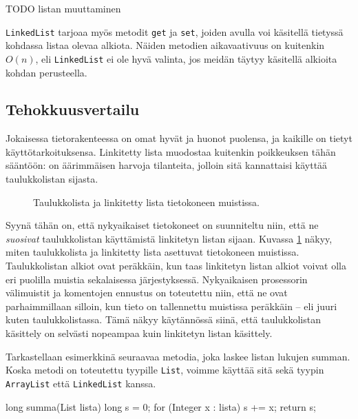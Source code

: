 TODO listan muuttaminen

\texttt{LinkedList} tarjoaa myös metodit \texttt{get} ja \texttt{set},
joiden avulla voi käsitellä tietyssä kohdassa listaa olevaa alkiota.
Näiden metodien aikavaativuus on kuitenkin $O(n)$,
eli \texttt{LinkedList} ei ole hyvä valinta,
jos meidän täytyy käsitellä alkioita kohdan perusteella.

\subsection{Tehokkuusvertailu}

Jokaisessa tietorakenteessa on omat hyvät ja huonot puolensa,
ja kaikille on tietyt käyttötarkoituksensa.
Linkitetty lista muodostaa kuitenkin poikkeuksen tähän sääntöön:
on äärimmäisen harvoja tilanteita, jolloin sitä kannattaisi
käyttää taulukkolistan sijasta.

\begin{figure}
\center
{}
\caption{Taulukkolista ja linkitetty lista tietokoneen muistissa.}
\label{fig:taulin}
\end{figure}


Syynä tähän on, että nykyaikaiset tietokoneet on suunniteltu niin,
että ne \emph{suosivat} taulukkolistan käyttämistä linkitetyn
listan sijaan.
Kuvassa \ref{fig:taulin} näkyy, miten taulukkolista ja linkitetty lista
asettuvat tietokoneen muistissa.
Taulukkolistan alkiot ovat peräkkäin, kun taas linkitetyn
listan alkiot voivat olla eri puolilla muistia sekalaisessa
järjestyksessä.
Nykyaikaisen prosessorin välimuistit ja komentojen ennustus
on toteutettu niin, että ne ovat parhaimmillaan silloin,
kun tieto on tallennettu muistissa peräkkäin -- eli juuri kuten
taulukkolistassa.
Tämä näkyy käytännössä siinä, että taulukkolistan käsittely on selvästi
nopeampaa kuin linkitetyn listan käsittely.

Tarkastellaan esimerkkinä seuraavaa metodia,
joka laskee listan lukujen summan.
Koska metodi on toteutettu tyypille \texttt{List},
voimme käyttää sitä sekä tyypin \texttt{ArrayList}
että \texttt{LinkedList} kanssa.

\begin{code}
long summa(List lista) {
    long s = 0;
    for (Integer x : lista) {
        s += x;
    }
    return s;
}
\end{code}
